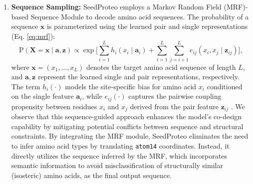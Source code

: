\begin{enumerate}
    \item \textbf{Sequence Sampling:} SeedProteo employs a Markov Random Field (MRF)-based Sequence Module \cite{renAccurateRobustProtein2024, meynardfast} to decode amino acid sequences. The probability of a sequence $\mathbf{x}$ is parameterized using the learned pair and single representations (Eq. \ref{eq:mrf}):
    \begin{equation}
    \label{eq:mrf}
        \mathrm{P}(\mathbf{X} = \mathbf{x} \mid \mathbf{a}, \mathbf{z}) 
        \propto \exp \bigg[ \sum_{i=1}^{L} h_i(x_i \mid \mathbf{a}_i) + \sum_{i=1}^{L}\sum_{j=i+1}^{L} e_{ij} (x_i, x_j \mid \mathbf{z}_{ij}) \bigg],
    \end{equation} 
    where $\mathbf{x} = (x_1, \dots, x_L)$ denotes the target amino acid sequence of length $L$, and $\mathbf{a}, \mathbf{z}$ represent the learned single and pair representations, respectively. The term $h_i(\cdot)$ models the site-specific bias for amino acid $x_i$ conditioned on the single feature $\mathbf{a}_i$, while $e_{ij}(\cdot)$ captures the pairwise coupling propensity between residues $x_i$ and $x_j$ derived from the pair feature $\mathbf{z}_{ij}$ \cite{balakrishnanLearningGenerativeModels2011}.
    We observe that this sequence-guided approach enhances the model's co-design capability by mitigating potential conflicts between sequence and structural constraints. By integrating the MRF module, SeedProteo eliminates the need to infer amino acid types by translating \texttt{atom14} coordinates. Instead, it directly utilizes the sequence inferred by the MRF, which incorporates semantic information to avoid misclassification of structurally similar (isosteric) amino acids, as the final output sequence.


\end{enumerate}
